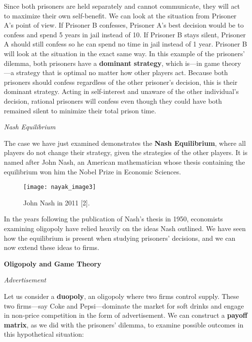     Since both prisoners are held separately and cannot communicate, they will act to maximize their own self-benefit. We can look at the situation from Prisoner A’s point of view. If Prisoner B confesses, Prisoner A’s best decision would be to confess and spend 5 years in jail instead of 10. If Prisoner B stays silent, Prisoner A should still confess so he can spend no time in jail instead of 1 year. Prisoner B will look at the situation in the exact same way. In this example of the prisoners’ dilemma, both prisoners have a \textbf{dominant strategy}, which is—in game theory—a strategy that is optimal no matter how other players act. Because both prisoners should confess regardless of the other prisoner’s decision, this is their dominant strategy. Acting in self-interest and unaware of the other individual’s decision, rational prisoners will confess even though they could have both remained silent to minimize their total prison time.

\noindent
\emph{Nash Equilibrium}

The case we have just examined demonstrates the \textbf{Nash Equilibrium}, where all players do not change their strategy, given the strategies of the other players. It is named after John Nash, an American mathematician whose thesis containing the equilibrium won him the Nobel Prize in Economic Sciences.

\renewcommand{\thefigure}{3}
\begin{figure}[htp]
    \centering
    \begin{minipage}{9cm}
    \texttt{[image: nayak\_image3]}
    \caption{John Nash in 2011 [2].}
    \label{fig:2}
    \end{minipage}
\end{figure}


In the years following the publication of Nash’s thesis in 1950, economists examining oligopoly have relied heavily on the ideas Nash outlined. We have seen how the equilibrium is present when studying prisoners’ decisions, and we can now extend these ideas to firms.

\noindent
\textbf{Oligopoly and Game Theory}

\noindent
\emph{Advertisement}

Let us consider a \textbf{duopoly}, an oligopoly where two firms control supply. These two firms—say Coke and Pepsi—dominate the market for soft drinks and engage in non-price competition in the form of advertisement. We can construct a \textbf{payoff matrix}, as we did with the prisoners’ dilemma, to examine possible outcomes in this hypothetical situation:

